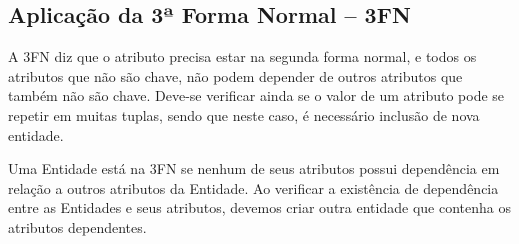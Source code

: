 \documentclass{article}
\begin{document}
\subsection*{Aplicação da 3ª Forma Normal – 3FN}
A 3FN diz que o atributo precisa estar na segunda forma normal, e todos os atributos que não são chave, não podem depender de outros atributos que também não são chave. Deve-se verificar ainda se o valor de um atributo pode se repetir em muitas tuplas, sendo que neste caso, é necessário inclusão de nova entidade.

Uma Entidade está na 3FN se nenhum de seus atributos possui dependência em relação a outros atributos da Entidade. Ao verificar a existência de dependência entre as Entidades e seus atributos, devemos criar outra entidade que contenha os atributos dependentes.
\end{document}
